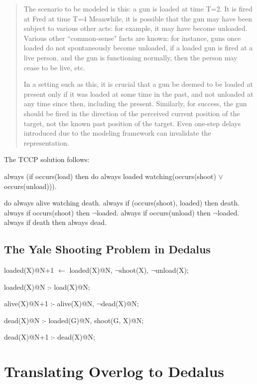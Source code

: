 \begin{quote}
The scenario to be modeled is this: a gun is loaded at time T=2. It is fired at Fred at time T=4 Meanwhile,
it is possible that the gun may have been subject to various other acts: for example, it 
may have become unloaded. Various other ``common-sense" facts are known: for instance,
guns once loaded do not spontaneously become unloaded, if a loaded gun is fired at a 
live person, and the gun is functioning normally, then the person may cease to be live,
etc.

In a setting such as this, it is crucial that a gun be deemed to be loaded at present only if 
it was loaded at some time in the past, and not unloaded at any time since then, including 
the present. Similarly, for success, the gun should be fired in the direction of the perceived 
current position of the target, not the known past position of the target. Even one-step 
delays introduced due to the modeling framework can invalidate the representation.
\end{quote}

The TCCP solution follows:

\begin{Dedalus}
always (if occurs(load) 
  then do always loaded 
    watching(occurs(shoot) \(\lor\) occurs(unload))).
		
		
do always alive watching death.
always if (occurs(shoot), loaded) then death.
always if occurs(shoot) then \(\lnot\)loaded. 
always if occurs(unload) then  \(\lnot\)loaded.
always if death then always dead.
\end{Dedalus}

\subsection{The Yale Shooting Problem in Dedalus}

\begin{Dedalus}
loaded(X)@N+1 \(\leftarrow\)
  loaded(X)@N,
  \(\lnot\)shoot(X),
  \(\lnot\)unload(X);
  
loaded(X)@N :-
   load(X)@N;
   
alive(X)@N+1 :-
  alive(X)@N,
  \(\lnot\)dead(X)@N;
  
dead(X)@N :-
  loaded(G)@N,
  shoot(G, X)@N;

dead(X)@N+1 :-
  dead(X)@N;

\end{Dedalus}


\section{Translating Overlog to Dedalus}

